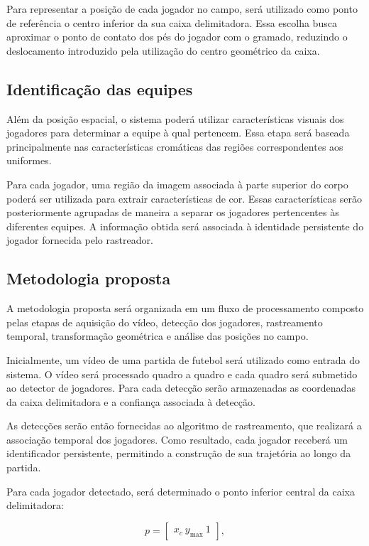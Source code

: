 Para representar a posição de cada jogador no campo, será utilizado como ponto de referência o centro inferior da sua caixa delimitadora. Essa escolha busca aproximar o ponto de contato dos pés do jogador com o gramado, reduzindo o deslocamento introduzido pela utilização do centro geométrico da caixa.

\subsection{Identificação das equipes}

Além da posição espacial, o sistema poderá utilizar características visuais dos jogadores para determinar a equipe à qual pertencem. Essa etapa será baseada principalmente nas características cromáticas das regiões correspondentes aos uniformes.

Para cada jogador, uma região da imagem associada à parte superior do corpo poderá ser utilizada para extrair características de cor. Essas características serão posteriormente agrupadas de maneira a separar os jogadores pertencentes às diferentes equipes. A informação obtida será associada à identidade persistente do jogador fornecida pelo rastreador.

\subsection{Metodologia proposta}

A metodologia proposta será organizada em um fluxo de processamento composto pelas etapas de aquisição do vídeo, detecção dos jogadores, rastreamento temporal, transformação geométrica e análise das posições no campo.

Inicialmente, um vídeo de uma partida de futebol será utilizado como entrada do sistema. O vídeo será processado quadro a quadro e cada quadro será submetido ao detector de jogadores. Para cada detecção serão armazenadas as coordenadas da caixa delimitadora e a confiança associada à detecção.

As detecções serão então fornecidas ao algoritmo de rastreamento, que realizará a associação temporal dos jogadores. Como resultado, cada jogador receberá um identificador persistente, permitindo a construção de sua trajetória ao longo da partida.

Para cada jogador detectado, será determinado o ponto inferior central da caixa delimitadora:

\begin{equation}
p =
\begin{bmatrix}
x_c \
y_{\max} \
1
\end{bmatrix},
\end{equation}

